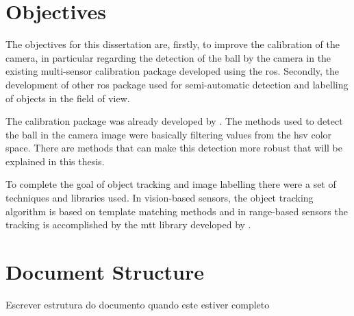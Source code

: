 \section{Objectives}
The objectives for this dissertation are, firstly, to improve the calibration of the camera, in particular regarding the detection of the ball by the camera in the existing multi-sensor calibration package developed using the \gls{ros}. Secondly, the development of other \gls{ros} package used for semi-automatic detection and labelling of objects in the field of view.

The calibration package was already developed by \cite{VieiradaSilva2016}. The methods used to detect the ball in the camera image were basically filtering values from the \gls{hsv} color space. There are methods that can make this detection more robust that will be explained in this thesis. 

To complete the goal of object tracking and image labelling there were a set of techniques and libraries used. In vision-based sensors, the object tracking algorithm is based on template matching methods and in range-based sensors the tracking is accomplished by the \gls{mtt} library developed by \cite{SoaresDeAlmeida2016a}.

\section{Document Structure}

Escrever estrutura do documento quando este estiver completo

